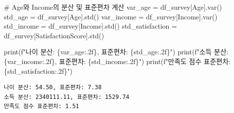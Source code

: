 \documentclass[
  letterpaper,
]{book}
\newenvironment{Shaded}{\begin{snugshade}}{\end{snugshade}}
\newcommand{\BuiltInTok}[1]{\textcolor[rgb]{0.00,0.23,0.31}{#1}}
\newcommand{\CommentTok}[1]{\textcolor[rgb]{0.37,0.37,0.37}{#1}}
\newcommand{\NormalTok}[1]{\textcolor[rgb]{0.00,0.23,0.31}{#1}}
\newcommand{\OperatorTok}[1]{\textcolor[rgb]{0.37,0.37,0.37}{#1}}
\newcommand{\SpecialCharTok}[1]{\textcolor[rgb]{0.37,0.37,0.37}{#1}}
\newcommand{\SpecialStringTok}[1]{\textcolor[rgb]{0.13,0.47,0.30}{#1}}
\newcommand{\StringTok}[1]{\textcolor[rgb]{0.13,0.47,0.30}{#1}}
\begin{document}
\begin{Shaded}
\begin{Highlighting}[]
    \CommentTok{\# Age와 Income의 분산 및 표준편차 계산}
\NormalTok{    var\_age }\OperatorTok{=}\NormalTok{ df\_survey[}\StringTok{\textquotesingle{}Age\textquotesingle{}}\NormalTok{].var()}
\NormalTok{    std\_age }\OperatorTok{=}\NormalTok{ df\_survey[}\StringTok{\textquotesingle{}Age\textquotesingle{}}\NormalTok{].std()}
\NormalTok{    var\_income }\OperatorTok{=}\NormalTok{ df\_survey[}\StringTok{\textquotesingle{}Income\textquotesingle{}}\NormalTok{].var()}
\NormalTok{    std\_income }\OperatorTok{=}\NormalTok{ df\_survey[}\StringTok{\textquotesingle{}Income\textquotesingle{}}\NormalTok{].std()}
\NormalTok{    std\_satisfaction }\OperatorTok{=}\NormalTok{ df\_survey[}\StringTok{\textquotesingle{}SatisfactionScore\textquotesingle{}}\NormalTok{].std()}

    \BuiltInTok{print}\NormalTok{(}\SpecialStringTok{f"나이 분산: }\SpecialCharTok{\{}\NormalTok{var\_age}\SpecialCharTok{:.2f\}}\SpecialStringTok{, 표준편차: }\SpecialCharTok{\{}\NormalTok{std\_age}\SpecialCharTok{:.2f\}}\SpecialStringTok{"}\NormalTok{)}
    \BuiltInTok{print}\NormalTok{(}\SpecialStringTok{f"소득 분산: }\SpecialCharTok{\{}\NormalTok{var\_income}\SpecialCharTok{:.2f\}}\SpecialStringTok{, 표준편차: }\SpecialCharTok{\{}\NormalTok{std\_income}\SpecialCharTok{:.2f\}}\SpecialStringTok{"}\NormalTok{)}
    \BuiltInTok{print}\NormalTok{(}\SpecialStringTok{f"만족도 점수 표준편차: }\SpecialCharTok{\{}\NormalTok{std\_satisfaction}\SpecialCharTok{:.2f\}}\SpecialStringTok{"}\NormalTok{)}
\end{Highlighting}
\end{Shaded}

\begin{verbatim}
나이 분산: 54.50, 표준편차: 7.38
소득 분산: 2340111.11, 표준편차: 1529.74
만족도 점수 표준편차: 1.51
\end{verbatim}
\end{document}
